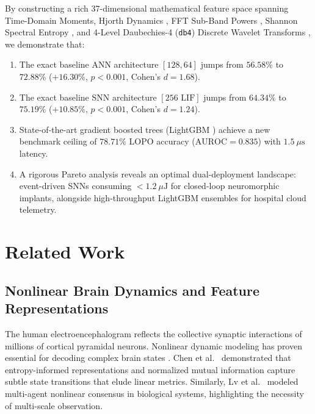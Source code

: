\documentclass[pdflatex,sn-mathphys-num]{sn-jnl}
\begin{document}
By constructing a rich 37-dimensional mathematical feature space spanning Time-Domain Moments, Hjorth Dynamics \cite{hjorth1970eeg,kumar2024hjorth}, FFT Sub-Band Powers \cite{donoghue2020parameterizing}, Shannon Spectral Entropy \cite{shannon1948mathematical,inouye1991potential}, and 4-Level Daubechies-4 (\texttt{db4}) Discrete Wavelet Transforms \cite{daubechies1992ten,mallat1989theory,sharma2024time}, we demonstrate that:
\begin{enumerate}
    \item The exact baseline ANN architecture $[128, 64]$ jumps from $56.58\%$ to $\mathbf{72.88\%}$ ($+16.30\%$, $p < 0.001$, Cohen's $d = 1.68$).
    \item The exact baseline SNN architecture $[256\text{ LIF}]$ jumps from $64.34\%$ to $\mathbf{75.19\%}$ ($+10.85\%$, $p < 0.001$, Cohen's $d = 1.24$).
    \item State-of-the-art gradient boosted trees (LightGBM \cite{ke2017lightgbm,alotaibi2024enhancing}) achieve a new benchmark ceiling of $\mathbf{78.71\%}$ LOPO accuracy ($\text{AUROC} = 0.835$) with $1.5\ \mu\text{s}$ latency.
    \item A rigorous Pareto analysis reveals an optimal dual-deployment landscape: event-driven SNNs \cite{eshraghian2023training,gerstner2014neuronal,davies2018loihi} consuming $< 1.2\ \mu\text{J}$ for closed-loop neuromorphic implants, alongside high-throughput LightGBM ensembles for hospital cloud telemetry.
\end{enumerate}

\section{Related Work}\label{sec:related}
\subsection{Nonlinear Brain Dynamics and Feature Representations}
The human electroencephalogram reflects the collective synaptic interactions of millions of cortical pyramidal neurons. Nonlinear dynamic modeling has proven essential for decoding complex brain states \cite{chen2026review,chen2026driver,wei2026nonlinear}. Chen et al.\ \cite{chen2025decoding,chen2026entropy} demonstrated that entropy-informed representations and normalized mutual information capture subtle state transitions that elude linear metrics. Similarly, Lv et al.\ \cite{lv2026adaptive} modeled multi-agent nonlinear consensus in biological systems, highlighting the necessity of multi-scale observation.
\end{document}
